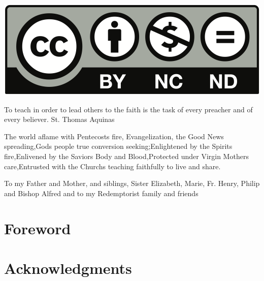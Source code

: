 \documentclass[oneside]{book}
\begin{document}
\begin{center} 
\includegraphics[scale=0.6]{by-nc-nd}
\end{center}


To teach in order to lead others to the faith is the task of every preacher and
of every believer. St. Thomas Aquinas


The world aflame with Pentecosts fire, Evangelization, the Good News
spreading,Gods people true conversion seeking;Enlightened by the Spirits
fire,Enlivened by the Saviors Body and Blood,Protected under Virgin Mothers
care,Entrusted with the Churchs teaching faithfully to live and share.


To my Father and Mother, and siblings, Sister Elizabeth, Marie, Fr. Henry,
Philip and Bishop Alfred and to my Redemptorist family and friends


\maketitle


\chapter{Foreword}


\chapter{Acknowledgments}
\end{document}
